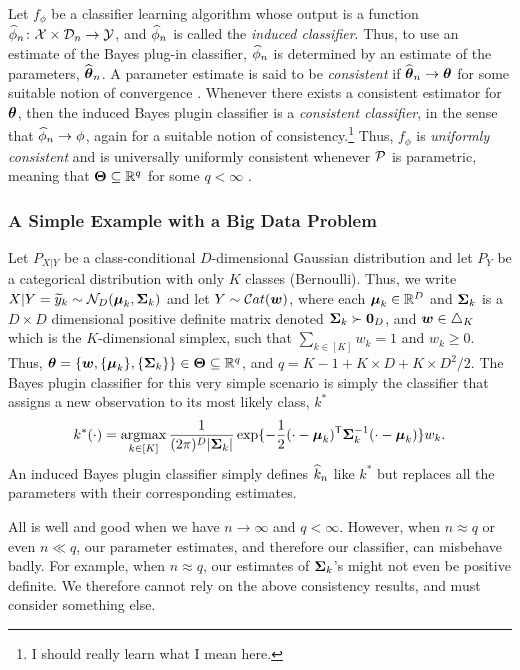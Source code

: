 \documentclass[10pt]{article}
\begin{document}
Let $f_\phi$ be a classifier learning algorithm whose output is a function
 $\widehat{\phi}_n {\colon} \mathcal{X} \times \mathcal{D}_n \to \mathcal{Y}$, and  $\widehat{\phi}_n$ is called the \emph{induced classifier}. Thus, to use an estimate of the Bayes plug-in classifier, $\widehat{\phi}_n$ is determined by an estimate of the parameters, $\widehat{\boldsymbol{\theta}}_n$.  A parameter estimate is said to be \emph{consistent} if $\widehat{\boldsymbol{\theta}}_n \rightarrow \boldsymbol{\theta}$ for some suitable notion of convergence \cite{Bickel2006}.  
Whenever there exists a consistent estimator for $\boldsymbol{\theta}$, then the induced Bayes plugin classifier is a \emph{consistent classifier}, in the sense that $\widehat{\phi}_n \rightarrow \phi$, again for a suitable notion of consistency.\footnote{I should really learn what I mean here.} Thus, $f_\phi$ is \emph{uniformly consistent} and is universally uniformly consistent whenever $\mathcal{P}$ is parametric, meaning that $\boldsymbol{\Theta} \subseteq \mathbb{R}^q$ for some $q < \infty$ \cite{Vapnik1998, Villa2013}. 








\subsubsection{A Simple Example with a Big Data Problem}


 Let $P_{X|Y}$ be a class-conditional $D$-dimensional Gaussian distribution and let $P_Y$ be a categorical distribution with only $K$ classes (Bernoulli).  Thus, we write ${X|Y=\widetilde{y}_k} \sim \mathcal{N}_D(\boldsymbol{\mu}_k, \boldsymbol{\Sigma}_k)$ and let $Y \sim \mathcal{C}at(\boldsymbol{w})$, where each $\boldsymbol{\mu}_k \in \mathbb{R}^D$ and $\boldsymbol{\Sigma}_k$ is a $D \times D$ dimensional positive definite matrix denoted  $\boldsymbol{\Sigma}_k \succ \boldsymbol{0}_D$, and $\boldsymbol{w} \in \triangle_K$ which is the $K$-dimensional simplex, such that $\sum_{k \in [K]} w_k=1$ and $w_k\geq 0$. Thus, $\boldsymbol{\theta}=\{\boldsymbol{w},\{\boldsymbol{\mu}_k\}, \{\boldsymbol{\Sigma}_k\}\} \in \boldsymbol{\Theta} \subseteq \mathbb{R}^q$, and $q=K-1+K\times D+K \times D^2/2$.  
% 
The Bayes plugin classifier for this very simple scenario is simply the classifier that assigns a new observation to its most likely class, $k^*$
\begin{align}
k^*(\cdot) =	\argmax_{k \in [K]}  \frac{1}{(2 \pi)^D |\bSig_k|} \exp\{ -\frac{1}{2}(\cdot - \bmu_k)\T \bSig_k^{-1} (\cdot - \bmu_k)\} w_k.
\end{align}
An induced Bayes plugin classifier simply defines $\widehat{k}_n$ like $k^*$ but replaces all the parameters with their corresponding estimates.  

All is well and good when we have $n \to \infty$ and $q < \infty$.  However, when $n \approx q$ or even $n \ll q$, our parameter estimates, and therefore our classifier, can misbehave badly.  For example, when $n \approx q$, our estimates of $\boldsymbol{\Sigma}_k$'s might not even be positive definite.   We therefore cannot rely on the above consistency results, and must consider something else. 




% 
% 





\end{document}
